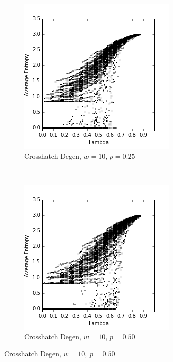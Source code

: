 \documentclass[a4paper,11pt,twoside]{report}
\begin{document}
\begin{figure}[htp]
\centering
\begin{subfigure}[t]{0.4\textwidth}
  \includegraphics[width=\textwidth]{ch6_figs/ch_w10_p25_entropy_scatter}
  \caption{Crosshatch Degen, $w=10$, $p=0.25$}

\end{subfigure}
~
\begin{subfigure}[t]{0.4\textwidth}
  \centering
  \includegraphics[width=\textwidth]{ch6_figs/ch_w10_p50_entropy_scatter}
  \caption{Crosshatch Degen, $w=10$, $p=0.50$}


\end{subfigure}
\end{figure}
\end{document}
